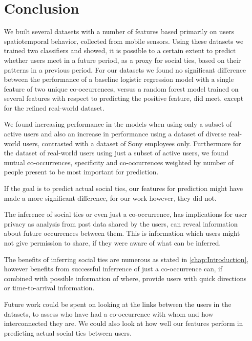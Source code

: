 \chapter{Conclusion}
\label{chap:conclusion}
We built several datasets with a number of features based primarily on users spatiotemporal behavior, collected from mobile sensors. Using these datasets we trained two classifiers and showed, it is possible to a certain extent to predict whether users meet in a future period, as a proxy for social ties, based on their patterns in a previous period. For our datasets we found no significant difference between the performance of a baseline logistic regression model with a single feature of two unique co-occurrences, versus a random forest model trained on several features with respect to predicting the positive feature, did meet, except for the refined real-world dataset.

We found increasing performance in the models when using only a subset of active users and also an increase in performance using a dataset of diverse real-world users, contrasted with a dataset of Sony employees only. Furthermore for the dataset of real-world users using just a subset of active users, we found mutual co-occurrences, specificity and co-occurrences weighted by number of people present to be most important for prediction.

If the goal is to predict actual social ties, our features for prediction might have made a more significant difference, for our work however, they did not.

The inference of social ties or even just a co-occurrence, has implications for user privacy as analysis from past data shared by the users, can reveal information about future occurrences between them. This is information which users might not give permission to share, if they were aware of what can be inferred.

The benefits of inferring social ties are numerous as stated in \autoref{chap:Introduction}, however benefits from successful inferrence of just a co-occurrence can, if combined with possible information of where, provide users with quick directions or time-to-arrival information.

Future work could be spent on looking at the links between the users in the datasets, to assess who have had a co-occurrence with whom and how interconnected they are. We could also look at how well our features perform in predicting actual social ties between users.